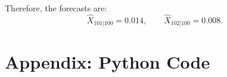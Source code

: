 \documentclass[12pt]{article}
\begin{document}
	Therefore, the forecasts are:
	\[
	\hat X_{101|100}=0.014, \qquad \hat X_{102|100}=0.008.
	\]
	
	\newpage
	\section{Appendix: Python Code}
	
	
	
\end{document}
